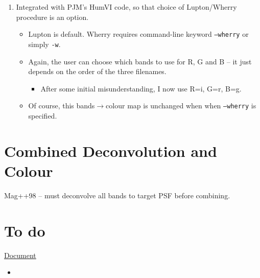 \documentclass[letterpaper, 11pt]{article}
\def\MORE{{\color{red}{\bf MORE}}\xspace}
\begin{document}
\begin{enumerate}
\begin{itemize}
	\end{itemize}
	\item Integrated with PJM's HumVI code, so that choice of Lupton/Wherry procedure is an option.
	\begin{itemize}
		\item Lupton is default. Wherry requires command-line keyword \texttt{--wherry} or simply \texttt{-w}.
		\item Again, the user can choose which bands to use for R, G and B -- it just depends on the order of the three filenames.
		\begin{itemize}
			\item After some initial misunderstanding, I now use R=i, G=r, B=g.
		\end{itemize}
		\item Of course, this bands$\rightarrow$colour map is unchanged when when \texttt{--wherry} is specified.
	\end{itemize}
\end{enumerate}





\section{Combined Deconvolution and Colour}

Mag++98 -- must deconvolve all bands to target PSF before combining.



\section{To do}

\underline{Document}
\begin{itemize}
	\item 
\end{itemize}
\end{document}
